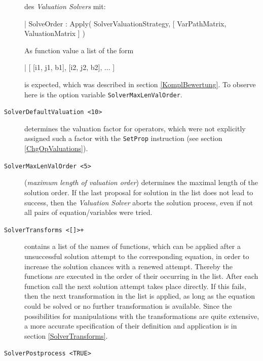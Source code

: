 \begin{description}
des {\em Valuation Solvers} mit:
\begin{literatim}{|}
     SolveOrder : Apply( 
       SolverValuationStrategy, [ VarPathMatrix, ValuationMatrix ]
     )
\end{literatim}
As function value a list of the form
\begin{literatim}{|}
     [ [i1, j1, b1], [i2, j2, b2], ... ]
\end{literatim}
 is expected, which was  
 described in section  \ref{KomplBewertung}. \nl To observe here is the option variable \verb+SolverMaxLenValOrder+.
%
\item[{\tt SolverDefaultValuation <10>}] 
determines the valuation factor for operators, which were not explicitly assigned such a factor with the \verb+SetProp+ instruction  (see section \ref{ChgOpValuations}).
%
\item[{\tt SolverMaxLenValOrder <5>}] ({\em maximum length of valuation order}) 
determines the maximal length of the solution order. If the last proposal for solution in the list does not lead to success, then the  {\em Valuation Solver} aborts the solution process, even if not all pairs of equation/variables were tried.
%
\item[{\tt SolverTransforms <[]>+}] 
contains a list of the names of functions, which can be applied after a unsuccessful solution attempt to the corresponding equation, in order to increase the solution chances with a renewed attempt. Thereby the functions are executed  in the order of their occurring in the list. After each function call  the next solution attempt takes place directly. If this fails, then the next transformation in the list is applied, as long as the equation could be solved or no further transformation is available. Since the possibilities for manipulations  with the transformations are quite extensive,  a more accurate specification of their definition and application is in section \ref{SolverTransforms}.
%
\item[{\tt SolverPostprocess <TRUE>}] 


\end{description}

